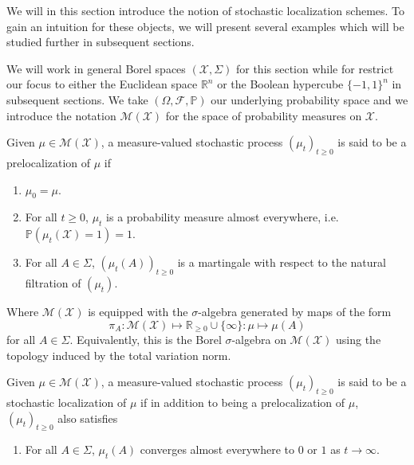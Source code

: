 We will in this section introduce the notion of stochastic localization schemes. 
To gain an intuition for these objects, we will present several examples which 
will be studied further in subsequent sections. 

We will work in general Borel spaces \((\mathcal{X}, \Sigma)\) for this section while for restrict our 
focus to either the Euclidean space \(\mathbb{R}^n\) or the Boolean hypercube \(\{-1, 1\}^n\) 
in subsequent sections. We take \((\Omega, \mathscr{F}, \mathbb{P})\) our underlying probability space 
and we introduce the notation \(\mathcal{M}(\mathcal{X})\) for the space of probability measures on 
\(\mathcal{X}\).

\begin{definition}
  Given \(\mu \in \mathcal{M}(\mathcal{X})\), a measure-valued stochastic process 
  \((\mu_t)_{t \ge 0}\) is said to be a prelocalization of \(\mu\) if 
  \begin{enumerate}[label=(L\arabic*), start=0]
    \item \label{L0} \(\mu_0 = \mu\).
    \item \label{L1} For all \(t \ge 0\), \(\mu_t\) is a probability measure almost everywhere, i.e. 
      \(\mathbb{P}(\mu_t(\mathcal{X}) = 1) = 1\).
    \item \label{L2} For all \(A \in \Sigma\), \((\mu_t(A))_{t \ge 0}\) is a martingale with respect 
      to the natural filtration of \((\mu_t)\).
  \end{enumerate}
  Where \(\mathcal{M}(\mathcal{X})\) is equipped with the \(\sigma\)-algebra generated by maps of the form 
  \[\pi_A : \mathcal{M}(\mathcal{X}) \mapsto \mathbb{R}_{\ge 0} \cup \{\infty\} : \mu \mapsto \mu(A)\] 
  for all \(A \in \Sigma\). Equivalently, this is the Borel \(\sigma\)-algebra on \(\mathcal{M}(\mathcal{X})\) 
  using the topology induced by the total variation norm.
\end{definition}

\begin{definition}
  Given \(\mu \in \mathcal{M}(\mathcal{X})\), a measure-valued stochastic process 
  \((\mu_t)_{t \ge 0}\) is said to be a stochastic localization of \(\mu\) if in addition to being a 
  prelocalization of \(\mu\), \((\mu_t)_{t \ge 0}\) also satisfies
  \begin{enumerate}[label=(L\arabic*), start=3]
    \item \label{L3} For all \(A \in \Sigma\), \(\mu_t(A)\) converges almost everywhere to \(0\) 
      or \(1\) as \(t \to \infty\).
  \end{enumerate}
\end{definition}

